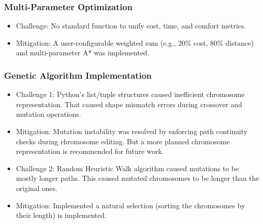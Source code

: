 \documentclass[conference]{IEEEtran}
\begin{document}
\subsubsection{Multi-Parameter Optimization}
\begin{itemize}
    \item Challenge: No standard function to unify cost, time, and comfort metrics. 
    \item Mitigation: A user-configurable weighted sum (e.g., 20\% cost, 80\% distance) and multi-parameter A* was implemented. 
\end{itemize}

\subsubsection{Genetic Algorithm Implementation}
\begin{itemize}
    \item Challenge 1: Python's list/tuple structures caused inefficient chromosome representation. That caused shape mismatch errors during crossover and mutation operations.
    \item Mitigation: Mutation instability was resolved by enforcing path continuity checks during chromosome editing. But a more planned chromosome representation is recommended for future work.
    
    \item Challenge 2: Random Heuristic Walk algorithm caused mutations to be mostly longer paths. This caused mutated chromosomes to be longer than the original ones. 
    \item Mitigation: Implemented a natural selection (sorting the chromosomes by their length) is implemented.
\end{itemize}

\end{document}

